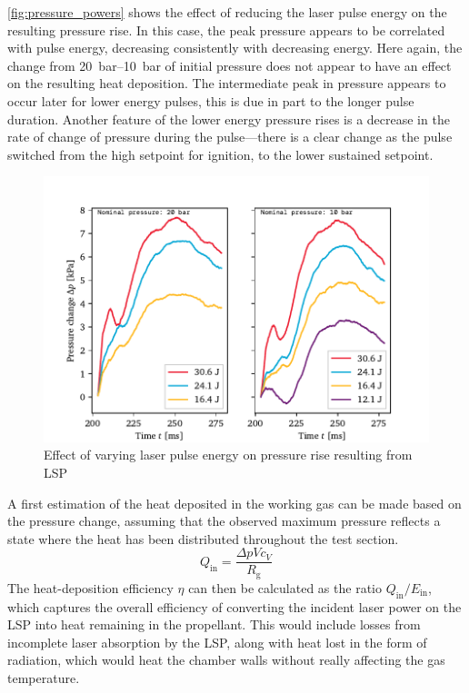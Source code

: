             \autoref{fig:pressure_powers} shows the effect of reducing the laser pulse energy on the resulting pressure rise. In this case, the peak pressure appears to be correlated with pulse energy, decreasing consistently with decreasing energy. Here again, the change from \qtyrange{20}{10}{bar} of initial pressure does not appear to have an effect on the resulting heat deposition. The intermediate peak in pressure appears to occur later for lower energy pulses, this is due in part to the longer pulse duration. Another feature of the lower energy pressure rises is a decrease in the rate of change of pressure during the pulse---there is a clear change as the pulse switched from the high setpoint for ignition, to the lower sustained setpoint.

            \begin{figure}[h]
                \centering
                \includegraphics[]{assets/5 results/pressure_powers}
                \caption{Effect of varying laser pulse energy on pressure rise resulting from LSP}
                \label{fig:pressure_powers}
            \end{figure}

            A first estimation of the heat deposited in the working gas can be made based on the pressure change, assuming that the observed maximum pressure reflects a state where the heat has been distributed throughout the test section. 
            \begin{equation} \label{eq:heatdep}
                Q_\mathrm{in} = \frac{\Delta pVc_V}{R_\mathrm{g}}
            \end{equation}
            The heat-deposition efficiency $\eta$ can then be calculated as the ratio $Q_\mathrm{in}/E_\mathrm{in}$, which captures the overall efficiency of converting the incident laser power on the LSP into heat remaining in the propellant. This would include losses from incomplete laser absorption by the LSP, along with heat lost in the form of radiation, which would heat the chamber walls without really affecting the gas temperature.

